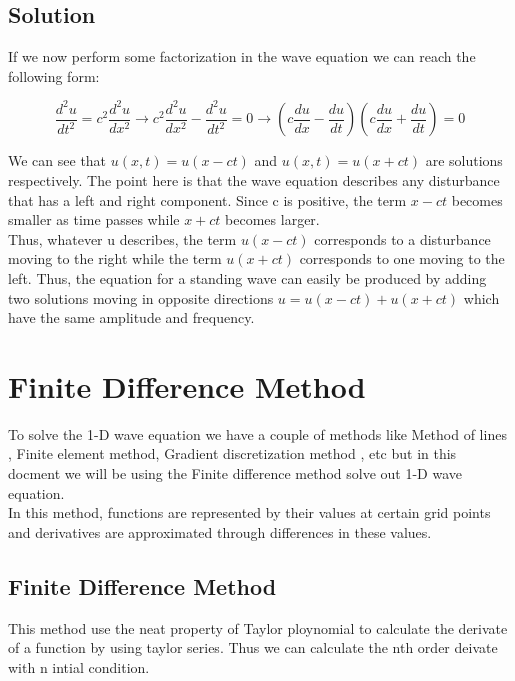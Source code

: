 \documentclass[oneside,hidelinks]{book}
\begin{document}
                \section{Solution}

                If we now perform some factorization 
                in the wave equation we can reach the following form:

                $$\frac{d^2u}{dt^2}=c^2\frac{d^2u}{dx^2}\rightarrow c^2\frac{d^2u}{dx^2}-\frac{d^2u}{dt^2}=0\rightarrow (c\frac{du}{dx}-\frac{du}{dt})(c\frac{du}{dx}+\frac{du}{dt})=0$$

                We can see that $u(x, t) = u(x - ct)$ and $u(x, t) = u(x+ct)$ are solutions respectively. The point here is that the wave equation 
                describes any disturbance that has a left and 
                right component. Since c is positive, the term
                $x - ct$ becomes smaller as time passes while $x+ct$ 
                becomes larger.\\

                Thus, whatever u describes, the term $u(x - ct)$ corresponds
                 to a disturbance moving to the right while the 
                 term $u(x+ct)$ corresponds to one moving to the left.
                Thus, the equation for a standing wave can easily be
                 produced by adding two solutions moving in opposite
                  directions $u = u(x -ct) + u(x+ct)$  which have the same amplitude
                   and frequency.


 
        \chapter{Finite Difference Method}
        To solve the 1-D wave equation we have a couple of methods like Method of lines , Finite element method, Gradient discretization method , etc
        but in this docment we will be using the Finite difference method solve out 1-D wave equation.\\
        In this method, functions are represented by their values at certain grid points and derivatives are approximated through differences in these values.

        
                \section{Finite Difference Method}
                This method use the neat property of Taylor ploynomial to calculate the derivate of a function by using taylor series. 
                Thus we can calculate the nth order deivate with n intial condition.\\
\end{document}
